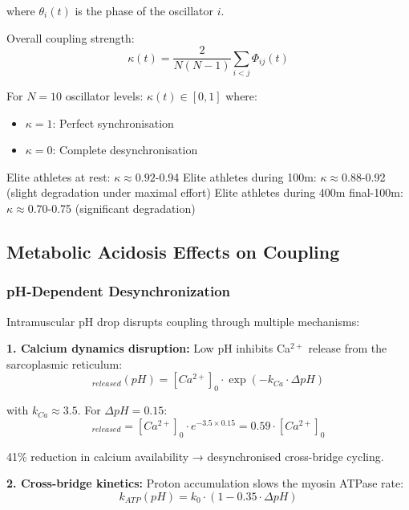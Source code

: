 where $\theta_i(t)$ is the phase of the oscillator $i$.

Overall coupling strength:
\begin{equation}
\kappa(t) = \frac{2}{N(N-1)} \sum_{i<j} \Phi_{ij}(t)
\end{equation}

For $N = 10$ oscillator levels: $\kappa(t) \in [0,1]$ where:
\begin{itemize}
    \item $\kappa = 1$: Perfect synchronisation
    \item $\kappa = 0$: Complete desynchronisation
\end{itemize}

Elite athletes at rest: $\kappa \approx 0.92$-0.94
Elite athletes during 100m: $\kappa \approx 0.88$-0.92 (slight degradation under maximal effort)
Elite athletes during 400m final-100m: $\kappa \approx 0.70$-0.75 (significant degradation)

\subsection{Metabolic Acidosis Effects on Coupling}

\subsubsection{pH-Dependent Desynchronization}

Intramuscular pH drop disrupts coupling through multiple mechanisms:

\textbf{1. Calcium dynamics disruption:}
Low pH inhibits Ca$^{2+}$ release from the sarcoplasmic reticulum:
\begin{equation}
[Ca^{2+}]_{released}(pH) = [Ca^{2+}]_0 \cdot \exp\left(-k_{Ca} \cdot \Delta pH\right)
\end{equation}

with $k_{Ca} \approx 3.5$. For $\Delta pH = 0.15$:
\begin{equation}
[Ca^{2+}]_{released} = [Ca^{2+}]_0 \cdot e^{-3.5 \times 0.15} = 0.59 \cdot [Ca^{2+}]_0
\end{equation}

41\% reduction in calcium availability → desynchronised cross-bridge cycling.

\textbf{2. Cross-bridge kinetics:}
Proton accumulation slows the myosin ATPase rate:
\begin{equation}
k_{ATP}(pH) = k_0 \cdot \left(1 - 0.35 \cdot \Delta pH\right)
\end{equation}

